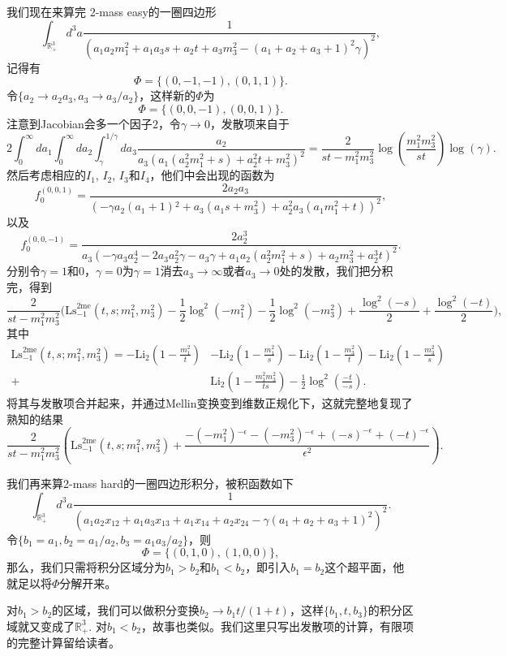 \documentclass[11pt]{article}
\theoremstyle{definition}
\theoremstyle{plain}
\begin{document}
我们现在来算完 2-mass easy的一圈四边形
\[
	\int_{\mathbb R_+^3}d^3a\frac{1}{(a_1a_2 m_1^2+a_1a_3s+a_2t+a_3m_3^2-(a_1+a_2+a_3+1)^2\gamma)^2},
\]
记得有
\[
	\Phi=\{(0, -1, -1), (0, 1, 1)\}.
\]
令$\{a_2\to a_2a_3,a_3\to a_3/a_2\}$，这样新的$\Phi$为
\[
	\Phi=\{(0, 0, -1), (0, 0, 1)\}.
\]
注意到Jacobian会多一个因子$2$，令$\gamma\to 0$，发散项来自于
\[
	2\int_0^\infty da_1\int_0^\infty da_2\int_{\gamma}^{1/\gamma} da_3\frac{a_2}{a_3 \left(a_1 \left(a_2^2 m_1^2+s\right)+a_2^2 t+m_3^2\right)^2}=\frac{2}{s t-m_1^2 m_3^2}\log \left(\frac{m_1^2 m_3^2}{s t}\right)\log(\gamma).
\]
然后考虑相应的$I_1$, $I_2$, $I_3$和$I_4$，他们中会出现的函数为
\[
	f^{(0,0,1)}_{0}=\frac{2 a_2 a_3}{\left(-\gamma a_2 \left(a_1+1\right){}^2 +a_3 \left(a_1 s+m_3^2\right)+a_2^2 a_3 \left(a_1 m_1^2+t\right)\right)^2},
\]
以及
\[
	f^{(0,0,-1)}_0=\frac{2 a_2^3}{a_3 \left(-\gamma a_3 a_2^4 -2 a_3 a_2^2 \gamma -a_3 \gamma +a_1 a_2 \left(a_2^2 m_1^2+s\right)+a_2 m_3^2+a_2^3 t\right)^2}.
\]
分别令$\gamma=1$和$0$，$\gamma=0$为$\gamma=1$消去$a_3\to \infty$或者$a_3\to 0$处的发散，我们把分积完，得到
\[
	\frac{2}{s t-m_1^2 m_3^2}\biggl(\mathrm{Ls}_{-1}^{\text{2me}}\left(t, s ; m_1^2, m_3^2\right)-\frac{1}{2} \log ^2\left(-m_1^2\right)-\frac{1}{2} \log ^2\left(-m_3^2\right)+\frac{\log ^2(-s)}{2}+\frac{\log ^2(-t)}{2}\biggr),
\]
其中
\[
	\begin{aligned}
		\mathrm{Ls}_{-1}^{\text{2me}}\left(t, s ; m_1^2, m_3^2\right)=-\mathrm{Li}_{2}\left(1-\frac{m_1^2}{t}\right) &-\mathrm{Li}_{2}\left(1-\frac{m_1^2}{s}\right)-\mathrm{Li}_{2}\left(1-\frac{m_3^2}{t}\right)-\mathrm{Li}_{2}\left(1-\frac{m_3^2}{s}\right) \\
		+& \mathrm{Li}_{2}\left(1-\frac{m_1^2 m_3^2}{t s}\right)-\frac{1}{2} \log ^{2}\left(\frac{-t}{-s}\right) .
		\end{aligned}
\]
将其与发散项合并起来，并通过Mellin变换变到维数正规化下，这就完整地复现了熟知的结果
\[
	\frac{2}{s t-m_1^2 m_3^2} \left(\mathrm{Ls}_{-1}^{\text{2me}}\left(t, s ; m_1^2, m_3^2\right)+\frac{-\left(-m_1^2\right){}^{-\epsilon}-\left(-m_3^2\right){}^{-\epsilon}+(-s)^{-\epsilon}+(-t)^{-\epsilon}}{\epsilon^2}\right).
\]

我们再来算2-mass hard的一圈四边形积分，被积函数如下
\[
	\int_{\mathbb R_+^3}d^3a\frac{1}{(a_1 a_2 x_{12}+a_1 a_3 x_{13}+a_1 x_{14}+a_2 x_{24}-\gamma (a_1+a_2+a_3+1)^2)^2}.
\]
令$\{b_1=a_1,b_2=a_1/a_2,b_3=a_1 a_3/a_2\}$，则
\[
	\Phi=\{(0,1,0),(1,0,0)\},
\]
那么，我们只需将积分区域分为$b_1>b_2$和$b_1<b_2$，即引入$b_1=b_2$这个超平面，他就足以将$\Phi$分解开来。

对$b_1>b_2$的区域，我们可以做积分变换$b_2\to b_1 t/(1+t)$，这样$\{b_1,t,b_3\}$的积分区域就又变成了$\mathbb R_+^3$. 对$b_1<b_2$，故事也类似。我们这里只写出发散项的计算，有限项的完整计算留给读者。
\end{document}

